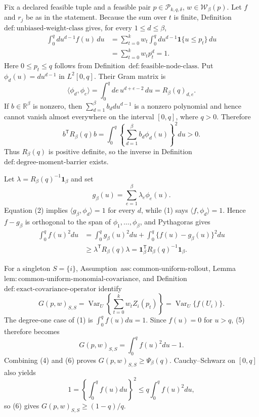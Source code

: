 Fix a declared feasible tuple and a feasible pair \(p\in\mathcal P_{k,q,\delta}\), \(w\in\mathcal W_\beta(p)\).  Let \(f\) and \(r_j\) be as in the statement.  Because the sum over \(t\) is finite, Definition~\(\mathrm{def{:}unbiased\text{-}weight\text{-}class}\) gives, for every \(1\le d\le\beta\),
\[
\begin{aligned}
\int_0^q d u^{d-1}f(u)\,du
&=\sum_{t=0}^k w_t\int_0^q d u^{d-1}\mathbf 1\{u\le p_t\}\,du\\
&=\sum_{t=0}^k w_t p_t^d=1.
\end{aligned}
\tag{1}
\]
Here \(0\le p_t\le q\) follows from Definition~\(\mathrm{def{:}feasible\text{-}node\text{-}class}\).  Put \(\phi_d(u)=d u^{d-1}\) in \(L^2[0,q]\).  Their Gram matrix is
\[
\langle\phi_d,\phi_e\rangle
=\int_0^q de\,u^{d+e-2}\,du
=R_\beta(q)_{d,e}.
\tag{2}
\]
If \(b\in\mathbb R^\beta\) is nonzero, then \(\sum_{d=1}^\beta b_d d u^{d-1}\) is a nonzero polynomial and hence cannot vanish almost everywhere on the interval \([0,q]\), where \(q>0\).  Therefore
\[
b^{\mathsf T}R_\beta(q)b
=\int_0^q\left\{\sum_{d=1}^\beta b_d\phi_d(u)\right\}^2du>0.
\tag{3}
\]
Thus \(R_\beta(q)\) is positive definite, so the inverse in Definition~\(\mathrm{def{:}degree\text{-}moment\text{-}barrier}\) exists.

Let \(\lambda=R_\beta(q)^{-1}\mathbf 1_\beta\) and set
\[
g_\beta(u)=\sum_{e=1}^\beta\lambda_e\phi_e(u).
\]
Equation (2) implies \(\langle g_\beta,\phi_d\rangle=1\) for every \(d\), while (1) says \(\langle f,\phi_d\rangle=1\).  Hence \(f-g_\beta\) is orthogonal to the span of \(\phi_1,\ldots,\phi_\beta\), and Pythagoras gives
\[
\begin{aligned}
\int_0^q f(u)^2du
&=\int_0^q g_\beta(u)^2du
+\int_0^q\{f(u)-g_\beta(u)\}^2du\\
&\ge \lambda^{\mathsf T}R_\beta(q)\lambda
=\mathbf 1_\beta^{\mathsf T}R_\beta(q)^{-1}\mathbf 1_\beta.
\end{aligned}
\tag{4}
\]

For a singleton \(S=\{i\}\), Assumption~\(\mathrm{ass{:}common\text{-}uniform\text{-}rollout}\), Lemma~\(\mathrm{lem{:}common\text{-}uniform\text{-}monomial\text{-}covariance}\), and Definition~\(\mathrm{def{:}exact\text{-}covariance\text{-}operator}\) identify
\[
G(p,w)_{S,S}
=\operatorname{Var}_U\!\left\{\sum_{t=0}^k w_tZ_i(p_t)\right\}
=\operatorname{Var}_U\{f(U_i)\}.
\tag{5}
\]
The degree-one case of (1) is \(\int_0^qf(u)du=1\).  Since \(f(u)=0\) for \(u>q\), (5) therefore becomes
\[
G(p,w)_{S,S}=\int_0^q f(u)^2du-1.
\tag{6}
\]
Combining (4) and (6) proves \(G(p,w)_{S,S}\ge\Psi_\beta(q)\).  Cauchy--Schwarz on \([0,q]\) also yields
\[
1=\left\{\int_0^qf(u)du\right\}^2
\le q\int_0^qf(u)^2du,
\tag{7}
\]
so (6) gives \(G(p,w)_{S,S}\ge(1-q)/q\).

